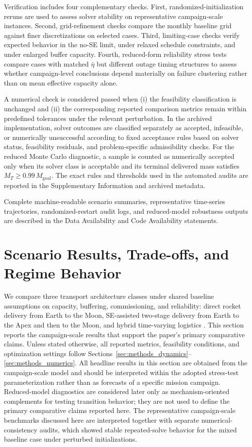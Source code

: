 \documentclass[12pt]{article}
\begin{document}
Verification includes four complementary checks. First, randomized-initialization reruns are used to assess solver stability on representative campaign-scale instances. Second, grid-refinement checks compare the monthly baseline grid against finer discretizations on selected cases. Third, limiting-case checks verify expected behavior in the no-SE limit, under relaxed schedule constraints, and under enlarged buffer capacity. Fourth, reduced-form reliability stress tests compare cases with matched $\bar{\eta}$ but different outage timing structures to assess whether campaign-level conclusions depend materially on failure clustering rather than on mean effective capacity alone.

A numerical check is considered passed when (i) the feasibility classification is unchanged and (ii) the corresponding reported comparison metrics remain within predefined tolerances under the relevant perturbation. In the archived implementation, solver outcomes are classified separately as accepted, infeasible, or numerically unsuccessful according to fixed acceptance rules based on solver status, feasibility residuals, and problem-specific admissibility checks. For the reduced Monte Carlo diagnostic, a sample is counted as numerically accepted only when its solver class is acceptable and its terminal delivered mass satisfies \(M_T \ge 0.99\,M_{\mathrm{goal}}\). The exact rules and thresholds used in the automated audits are reported in the Supplementary Information and archived metadata.

Complete machine-readable scenario summaries, representative time-series trajectories, randomized-restart audit logs, and reduced-model robustness outputs are described in the Data Availability and Code Availability statements.


\section{Scenario Results, Trade-offs, and Regime Behavior}
\label{sec:results}

We compare three transport architecture classes under shared baseline assumptions on capacity, buffering, commissioning, and reliability: direct rocket delivery from Earth to the Moon, SE-assisted two-stage delivery from Earth to the Apex and then to the Moon, and hybrid time-varying logistics \cite{COMAP2026B}. This section reports the campaign-scale results that support the paper’s primary comparative claims. Unless stated otherwise, all reported metrics, feasibility conditions, and optimization settings follow Sections~\ref{sec:methods_dynamics}--\ref{sec:methods_numerics}. All headline results in this section are obtained from the campaign-scale model and should be interpreted within the adopted stress-test parameterization rather than as forecasts of a specific mission campaign. Reduced-model diagnostics are considered later only as mechanism-oriented complements for testing transition behavior; they are not used to define the primary comparative claims reported here. The representative campaign-scale benchmarks discussed here are interpreted together with separate numerical-consistency audits, which showed stable repeated-solve behavior for the mixed baseline case under perturbed initializations.
\end{document}
